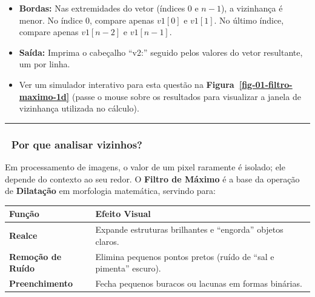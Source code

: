 \documentclass[
  portuguese,
  letterpaper,
  openany,
  oneside,
  12pt,
  a4paper]{book}
\providecommand{\tightlist}{%
  \setlength{\itemsep}{0pt}\setlength{\parskip}{0pt}}
\begin{document}
\begin{tcolorbox}
\begin{itemize}
\tightlist
\item
  \textbf{Bordas:} Nas extremidades do vetor (índices \(0\) e \(n-1\)),
  a vizinhança é menor. No índice \(0\), compare apenas \(v1[0]\) e
  \(v1[1]\). No último índice, compare apenas \(v1[n-2]\) e \(v1[n-1]\).
\item
  \textbf{Saída:} Imprima o cabeçalho ``v2:'' seguido pelos valores do
  vetor resultante, um por linha.
\item
  Ver um simulador interativo para esta questão na
  \textbf{Figura~\ref{fig-01-filtro-maximo-1d}} (passe o mouse sobre os
  resultados para visualizar a janela de vizinhança utilizada no
  cálculo).
\end{itemize}

\begin{center}\rule{0.5\linewidth}{0.5pt}\end{center}

\subsubsection{🧠 Por que analisar
vizinhos?}\label{por-que-analisar-vizinhos}

Em processamento de imagens, o valor de um pixel raramente é isolado;
ele depende do contexto ao seu redor. O \textbf{Filtro de Máximo} é a
base da operação de \textbf{Dilatação} em morfologia matemática,
servindo para:

\begin{longtable}[]{@{}
  >{\raggedright\arraybackslash}p{}
  >{\raggedright\arraybackslash}p{}@{}}
\toprule\noalign{}
\begin{minipage}[b]{\linewidth}\raggedright
Função
\end{minipage} & \begin{minipage}[b]{\linewidth}\raggedright
Efeito Visual
\end{minipage} \\
\midrule\noalign{}
\endhead
\bottomrule\noalign{}
\endlastfoot
\textbf{Realce} & Expande estruturas brilhantes e ``engorda'' objetos
claros. \\
\textbf{Remoção de Ruído} & Elimina pequenos pontos pretos (ruído de
``sal e pimenta'' escuro). \\
\textbf{Preenchimento} & Fecha pequenos buracos ou lacunas em formas
binárias. \\
\end{longtable}


\end{tcolorbox}
\end{document}
